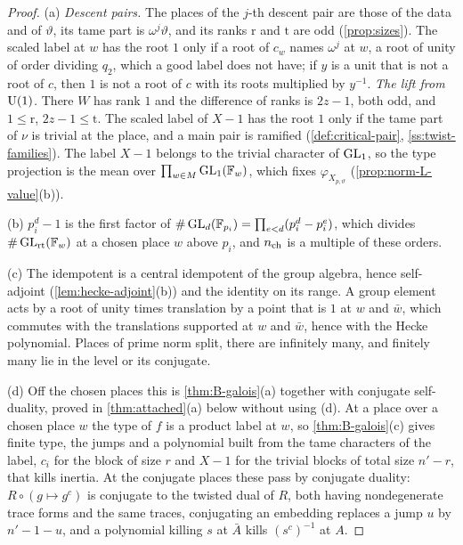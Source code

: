 \begin{proof}
(a) \emph{Descent pairs.} The places of the $j$-th descent pair are those of the data and of $\vartheta$, its tame part is $\omega^j\vartheta$, and its ranks $\mathrm r$ and $\mathrm t$ are odd (\cref{prop:sizes}). The scaled label at $w$ has
the root $1$ only if a root of $c_w$ names $\omega^j$ at $w$, a root of unity of order dividing $q_2$, which a good label does not have; if $y$ is a unit that is not a root of $c$, then $1$ is not a root of $c$ with its roots
multiplied by $y^{-1}$. \emph{The lift from $\operatorname{U}(1)$.} There $W$ has rank $1$ and the difference of ranks is $2z-1$, both odd, and $1\le\mathrm r$, $2z-1\le\mathrm t$. The scaled label of $X-1$ has the root $1$ only if the tame part of $\nu$
is trivial at the place, and a main pair is ramified (\cref{def:critical-pair}, \cref{ss:twist-families}). The label $X-1$ belongs to the trivial character of $\operatorname{GL}_1$, so the type projection is the mean over
$\prod_{w\in M}\operatorname{GL}_1(\mathbb{F}_w)$, which fixes $\varphi_{X_{p,\vartheta}}$ (\cref{prop:norm-L-value}(b)).

(b) $p_i^d-1$ is the first factor of $\#\operatorname{GL}_d(\mathbb{F}_{p_i})=\prod_{e<d}(p_i^d-p_i^e)$, which divides $\#\operatorname{GL}_{\mathrm r\mathrm t}(\mathbb{F}_w)$ at a chosen place $w$ above $p_i$, and $n_{\rm ch}$ is a multiple of these orders.

(c) The idempotent is a central idempotent of the group algebra, hence self-adjoint (\cref{lem:hecke-adjoint}(b)) and the identity on its range. A group element acts by a root of unity times translation by a point that is $1$
at $w$ and $\bar w$, which commutes with the translations supported at $w$ and $\bar w$, hence with the Hecke polynomial. Places of prime norm split, there are infinitely many, and finitely many lie in the level or its conjugate.

(d) Off the chosen places this is \cref{thm:B-galois}(a) together with conjugate self-duality, proved in \cref{thm:attached}(a) below without using (d). At a place over a chosen place $w$ the type of $f$ is a product label at $w$,
so \cref{thm:B-galois}(c) gives finite type, the jumps and a polynomial built from the tame characters of the label, $c_i$ for the block of size $r$ and $X-1$ for the trivial blocks of total size $n'-r$, that kills inertia.
At the conjugate places these pass by conjugate duality: $R\circ(g\mapsto g^c)$ is conjugate to the twisted dual of $R$, both having nondegenerate trace forms and the same traces, conjugating an embedding replaces a jump $u$
by $n'-1-u$, and a polynomial killing $s$ at $\bar A$ kills $(s^c)^{-1}$ at $A$.


\end{proof}
